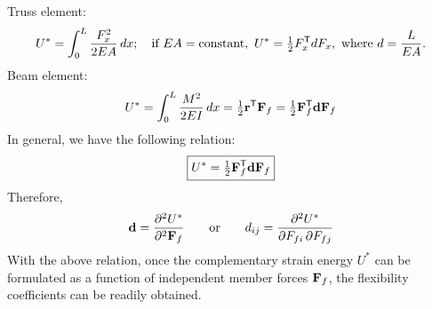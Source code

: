 Truss element:
\begin{equation}
  U^* = \int_0^L\frac{F_x^2}{2EA}\,dx;\quad\text{if } EA = \text{constant},\ U^* = \tfrac12F_x^{\mathsf{T}} dF_x,\ \text{where } d = \frac{L}{EA}.
\end{equation}
Beam element:
\begin{equation}
  U^* = \int_0^L\frac{M^2}{2EI}\,dx = \tfrac12\mathbf{r}^{\mathsf{T}}\mathbf{F}_f = \tfrac12\mathbf{F}_f^{\mathsf{T}}\mathbf{d}\mathbf{F}_f
\end{equation}
In general, we have the following relation:
\begin{equation}
  \boxed{U^* = \tfrac12\mathbf{F}_f^{\mathsf{T}}\mathbf{d}\mathbf{F}_f}
\end{equation}
Therefore,
\begin{equation}
  \mathbf{d} = \frac{\partial^2U^*}{\partial^2\mathbf{F}_f}\qquad\text{or}\qquad d_{ij} = \frac{\partial^2U^*}{\partial F_{fi}\,\partial F_{fj}}
\end{equation}
With the above relation, once the complementary strain energy $U^*$ can be formulated as a function of independent member forces $\mathbf{F}_f$, the flexibility coefficients can be readily obtained.

